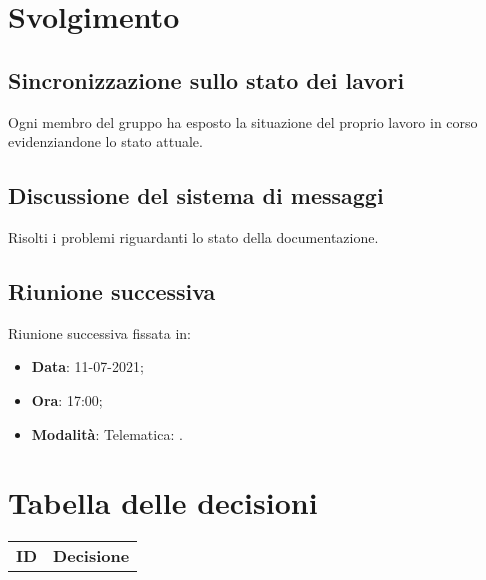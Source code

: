 \documentclass[]{article}
\begin{document}
	\newpage

	\section{Svolgimento}
		\subsection{Sincronizzazione sullo stato dei lavori}
		Ogni membro del gruppo ha esposto la situazione del proprio lavoro in corso evidenziandone lo stato attuale.\\
		
		\subsection{Discussione del sistema di messaggi}
		Risolti i problemi riguardanti lo stato della documentazione. \\
		
		\subsection{Riunione successiva}
		Riunione successiva fissata in:
		\begin{itemize}
			\item \textbf{Data}: 11-07-2021;
			\item \textbf{Ora}: 17:00;
			\item \textbf{Modalità}: Telematica: .
		\end{itemize}
	
	
\section{Tabella delle decisioni}

\begin{table} [h!]
	\begin{center}
		\begin{tabular} { m{2cm} m{14cm} }
			\rowcolor{lightgray}
			\textbf{ID} & \textbf{Decisione}\\
		\end{tabular}
	\end{center}
\end{table}
\end{document}
